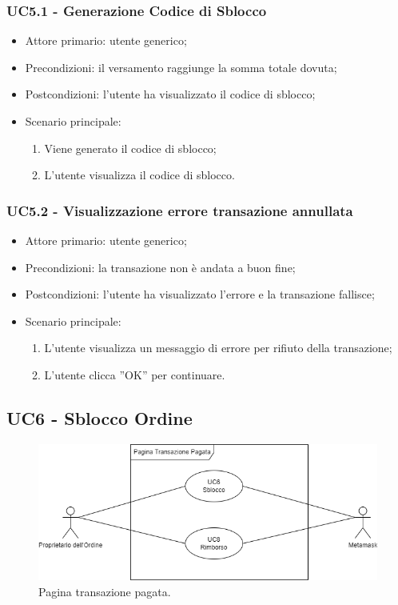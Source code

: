 \subsubsection{UC5.1 - Generazione Codice di Sblocco}

\begin{itemize}
    \item Attore primario: utente generico;
    \item Precondizioni: il versamento raggiunge la somma totale dovuta;
    \item Postcondizioni: l'utente ha visualizzato il codice di sblocco;
    \item Scenario principale:
          \begin{enumerate}
              \item Viene generato il codice di sblocco;
              \item L'utente visualizza il codice di sblocco.
          \end{enumerate}
\end{itemize}

\subsubsection{UC5.2 - Visualizzazione errore transazione annullata}

\begin{itemize}
    \item Attore primario: utente generico;
    \item Precondizioni: la transazione non è andata a buon fine;
    \item Postcondizioni: l'utente ha visualizzato l'errore e la transazione fallisce;
    \item Scenario principale:
          \begin{enumerate}
              \item L'utente visualizza un messaggio di errore per rifiuto della transazione;
              \item L'utente clicca ”OK” per continuare.
          \end{enumerate}
\end{itemize}

\subsection{UC6 - Sblocco Ordine}

\begin{figure}[H]
    \centering
    \includegraphics[scale=0.7]{immagini/UseCases-UC6.png}
    \caption{Pagina transazione pagata.}
\end{figure}

